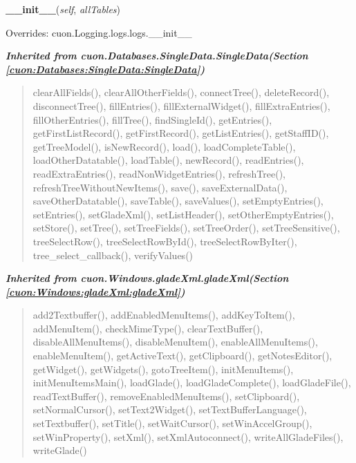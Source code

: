     \vspace{0.5ex}

\hspace{.8\funcindent}\begin{boxedminipage}{\funcwidth}

    \raggedright \textbf{\_\_init\_\_}(\textit{self}, \textit{allTables})

\setlength{\parskip}{2ex}
\setlength{\parskip}{1ex}
      Overrides: cuon.Logging.logs.logs.\_\_init\_\_

    \end{boxedminipage}


\large{\textbf{\textit{Inherited from cuon.Databases.SingleData.SingleData\textit{(Section \ref{cuon:Databases:SingleData:SingleData})}}}}

\begin{quote}
clearAllFields(), clearAllOtherFields(), connectTree(), deleteRecord(), disconnectTree(), fillEntries(), fillExternalWidget(), fillExtraEntries(), fillOtherEntries(), fillTree(), findSingleId(), getEntries(), getFirstListRecord(), getFirstRecord(), getListEntries(), getStaffID(), getTreeModel(), isNewRecord(), load(), loadCompleteTable(), loadOtherDatatable(), loadTable(), newRecord(), readEntries(), readExtraEntries(), readNonWidgetEntries(), refreshTree(), refreshTreeWithoutNewItems(), save(), saveExternalData(), saveOtherDatatable(), saveTable(), saveValues(), setEmptyEntries(), setEntries(), setGladeXml(), setListHeader(), setOtherEmptyEntries(), setStore(), setTree(), setTreeFields(), setTreeOrder(), setTreeSensitive(), treeSelectRow(), treeSelectRowById(), treeSelectRowByIter(), tree\_select\_callback(), verifyValues()
\end{quote}

\large{\textbf{\textit{Inherited from cuon.Windows.gladeXml.gladeXml\textit{(Section \ref{cuon:Windows:gladeXml:gladeXml})}}}}

\begin{quote}
add2Textbuffer(), addEnabledMenuItems(), addKeyToItem(), addMenuItem(), checkMimeType(), clearTextBuffer(), disableAllMenuItems(), disableMenuItem(), enableAllMenuItems(), enableMenuItem(), getActiveText(), getClipboard(), getNotesEditor(), getWidget(), getWidgets(), gotoTreeItem(), initMenuItems(), initMenuItemsMain(), loadGlade(), loadGladeComplete(), loadGladeFile(), readTextBuffer(), removeEnabledMenuItems(), setClipboard(), setNormalCursor(), setText2Widget(), setTextBufferLanguage(), setTextbuffer(), setTitle(), setWaitCursor(), setWinAccelGroup(), setWinProperty(), setXml(), setXmlAutoconnect(), writeAllGladeFiles(), writeGlade()
\end{quote}

